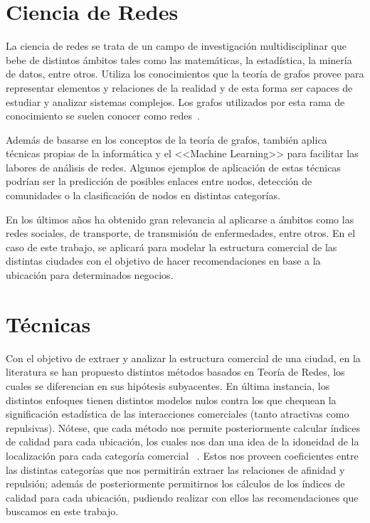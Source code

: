 \section{Ciencia de Redes}

La ciencia de redes se trata de un campo de investigación multidisciplinar que bebe de distintos ámbitos tales como las matemáticas, la estadística, la minería de datos, entre otros. Utiliza los conocimientos que la teoría de grafos provee para representar elementos y relaciones de la realidad y de esta forma ser capaces de estudiar y analizar sistemas complejos. Los grafos utilizados por esta rama de conocimiento se suelen conocer como redes~\cite{eswiki:151888116}.

Además de basarse en los conceptos de la teoría de grafos, también aplica técnicas propias de la informática y el <<Machine Learning>> para facilitar las labores de análisis de redes. Algunos ejemplos de aplicación de estas técnicas podrían ser la predicción de posibles enlaces entre nodos, detección de comunidades o la clasificación de nodos en distintas categorías.

En los últimos años ha obtenido gran relevancia al aplicarse a ámbitos como las redes sociales, de transporte, de transmisión de enfermedades, entre otros. En el caso de este trabajo, se aplicará para modelar la estructura comercial de las distintas ciudades con el objetivo de hacer recomendaciones en base a la ubicación para determinados negocios.


\section{Técnicas}
Con el objetivo de extraer y analizar la estructura comercial de una ciudad, en la literatura se han propuesto distintos métodos basados en Teoría de Redes, los cuales se diferencian en sus hipótesis subyacentes. En última instancia, los distintos enfoques tienen distintos modelos nulos contra los que chequean la significación estadística de las interacciones comerciales (tanto atractivas como repulsivas). Nótese, que cada método nos permite posteriormente calcular índices de calidad para cada ubicación, los cuales nos dan una idea de la idoneidad de la localización para cada categoría comercial ~\cite{Ahedo2021,RSVAJSSHJG}. Estos nos proveen coeficientes entre las distintas categorías que nos permitirán extraer las relaciones de afinidad y repulsión; además de posteriormente permitirnos los cálculos de los índices de calidad para cada ubicación, pudiendo realizar con ellos las recomendaciones que buscamos en este trabajo.

